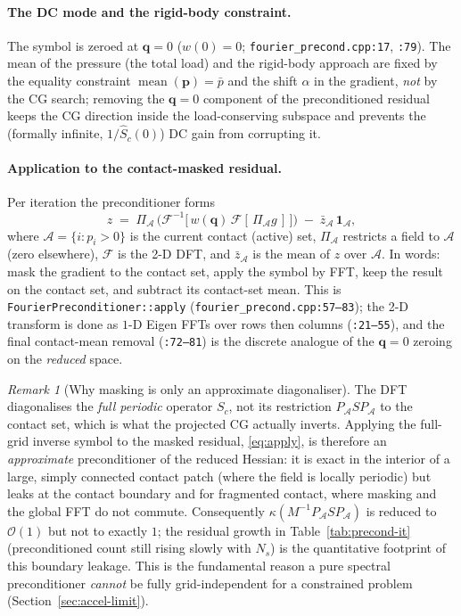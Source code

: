 \documentclass[11pt,a4paper]{article}
\newcommand{\Order}{\mathcal{O}}
\newcommand{\pp}{\mathbf{p}}
\newcommand{\code}[1]{\texttt{#1}}
\theoremstyle{definition}
\theoremstyle{remark}
\newtheorem{remark}{Remark}
\begin{document}
\paragraph{The DC mode and the rigid-body constraint.}
The symbol is zeroed at $\mathbf q=0$ ($w(0)=0$; \code{fourier\_precond.cpp:17},
\code{:79}). The mean of the pressure (the total load) and the rigid-body approach
are fixed by the equality constraint $\operatorname{mean}(\pp)=\bar p$ and the
shift $\alpha$ in the gradient, \emph{not} by the CG search; removing the
$\mathbf q=0$ component of the preconditioned residual keeps the CG direction
inside the load-conserving subspace and prevents the (formally infinite,
$1/\widehat S_c(0)$) DC gain from corrupting it.

\paragraph{Application to the contact-masked residual.}
Per iteration the preconditioner forms
\begin{equation}
  z \;=\; \Pi_{\mathcal A}\,\Big(\mathcal F^{-1}\big[\,w(\mathbf q)\,\mathcal F[\,
  \Pi_{\mathcal A} g\,]\,\big]\Big)\;-\;\bar z_{\mathcal A}\,\mathbf 1_{\mathcal A},
  \label{eq:apply}
\end{equation}
where $\mathcal A=\{i:p_i>0\}$ is the current contact (active) set,
$\Pi_{\mathcal A}$ restricts a field to $\mathcal A$ (zero elsewhere),
$\mathcal F$ is the 2-D DFT, and $\bar z_{\mathcal A}$ is the mean of $z$ over
$\mathcal A$. In words: mask the gradient to the contact set, apply the symbol by
FFT, keep the result on the contact set, and subtract its contact-set mean. This
is \code{FourierPreconditioner::apply} (\code{fourier\_precond.cpp:57--83}); the
2-D transform is done as $1$-D Eigen FFTs over rows then columns
(\code{:21--55}), and the final contact-mean removal (\code{:72--81}) is the
discrete analogue of the $\mathbf q=0$ zeroing on the \emph{reduced} space.

\begin{remark}[Why masking is only an approximate diagonaliser]
\label{rem:mask}
The DFT diagonalises the \emph{full periodic} operator $S_c$, not its restriction
$P_{\mathcal A}S P_{\mathcal A}$ to the contact set, which is what the projected
CG actually inverts. Applying the full-grid inverse symbol to the masked residual,
\eqref{eq:apply}, is therefore an \emph{approximate} preconditioner of the reduced
Hessian: it is exact in the interior of a large, simply connected contact patch
(where the field is locally periodic) but leaks at the contact boundary and for
fragmented contact, where masking and the global FFT do not commute. Consequently
$\kappa(M^{-1}P_{\mathcal A}SP_{\mathcal A})$ is reduced to $\Order(1)$ but not to
exactly $1$; the residual growth in Table~\ref{tab:precond-it} (preconditioned
count still rising slowly with $N_s$) is the quantitative footprint of this
boundary leakage. This is the fundamental reason a pure spectral preconditioner
\emph{cannot} be fully grid-independent for a constrained problem
(Section~\ref{sec:accel-limit}).
\end{remark}
\end{document}
